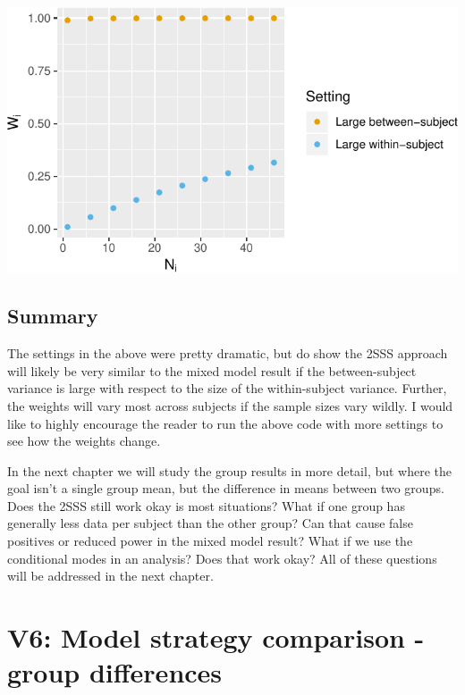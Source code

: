 \documentclass[
]{book}
\begin{document}
\begin{center}\includegraphics{3_video5_win_sub_mns_vs_cond_modes_files/figure-latex/unnamed-chunk-6-1} \end{center}

\hypertarget{summary-2}{%
\section{Summary}\label{summary-2}}

The settings in the above were pretty dramatic, but do show the 2SSS approach will likely be very similar to the mixed model result if the between-subject variance is large with respect to the size of the within-subject variance. Further, the weights will vary most across subjects if the sample sizes vary wildly. I would like to highly encourage the reader to run the above code with more settings to see how the weights change.

In the next chapter we will study the group results in more detail, but where the goal isn't a single group mean, but the difference in means between two groups. Does the 2SSS still work okay is most situations? What if one group has generally less data per subject than the other group? Can that cause false positives or reduced power in the mixed model result? What if we use the conditional modes in an analysis? Does that work okay? All of these questions will be addressed in the next chapter.

\hypertarget{v6-model-strategy-comparison---group-differences}{%
\chapter{V6: Model strategy comparison - group differences}\label{v6-model-strategy-comparison---group-differences}}
\end{document}
